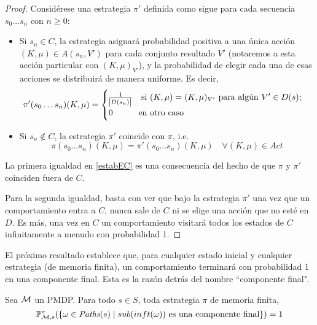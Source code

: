 \begin{proof}
	Considérese una estrategia $\pi'$ definida como sigue para cada secuencia $s_0 \dots s_n$ con $n \geq 0$:

	\begin{itemize}
		\item Si $s_n \in C$, la estrategia asignará probabilidad positiva a una única acción
		      $(K, \mu) \in A(s_n, V')$ para cada conjunto resultado $V'$ (notaremos a esta
		      acción particular con $(K, \mu)_{V'}$), y la probabilidad de elegir cada una de
		      esas acciones se distribuirá de manera uniforme. Es decir,
		      \[
			      \pi'(s_0 \dots s_n)(K, \mu) =
			      \begin{cases}
				      \frac{1}{\abs{D(s_n)}} \quad \text{si } (K, \mu) = (K, \mu)_{V'} \text{ para algún } V' \in D(s); \\
				      0 \qquad \quad \text{en otro caso}
			      \end{cases}
		      \]

		\item Si $s_n \notin C$, la estrategia $\pi'$ coincide con $\pi$, i.e.
		      \[
			      \pi(s_0 \dots s_n)(K, \mu) = \pi'(s_0\dots s_n)(K, \mu) \quad \forall (K, \mu) \in Act
		      \]

	\end{itemize}

	La primera igualdad en \ref{estabEC} es una consecuencia del hecho de que $\pi$
	y $\pi'$ coinciden fuera de $C$.

	Para la segunda igualdad, basta con ver que bajo la estrategia $\pi'$ una vez
	que un comportamiento entra a $C$, nunca sale de $C$ ni se elige una acción que
	no esté en $D$. Es más, una vez en $C$ un comportamiento visitará todos los
	estados de $C$ infinitamente a menudo con probabilidad 1.
\end{proof}

El próximo resultado establece que, para cualquier estado inicial y cualquier
estrategia (de memoria finita), un comportamiento terminará con probabilidad 1
en una componente final. Esta es la razón detrás del nombre ``componente
final".

\begin{theorem} \label{teoFundEC}
	Sea $\mathcal{M}$ un PMDP. Para todo $s \in S$, toda estrategia $\pi$ de memoria finita,
	$$\mathbb{P}^\pi_{\mathcal{M}, s}(\{ \omega \in \textit{Paths}(s) \mid sub(inft(\omega)) \text{ es una componente final}\}) = 1$$
\end{theorem}

